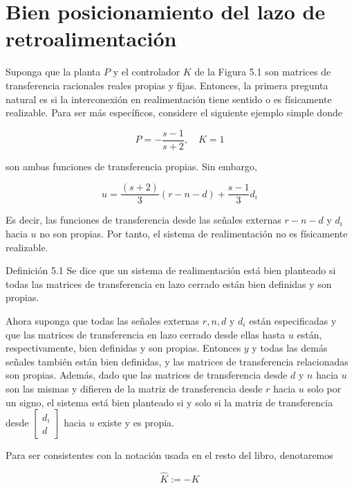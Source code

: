 
\section{Bien posicionamiento del lazo de retroalimentación}
Suponga que la planta $P$ y el controlador $K$ de la Figura 5.1 son matrices de transferencia racionales reales propias y fijas. Entonces, la primera pregunta natural es si la interconexión en realimentación tiene sentido o es físicamente realizable. Para ser más específicos, considere el siguiente ejemplo simple donde

$$
P=-\frac{s-1}{s+2}, \quad K=1
$$

son ambas funciones de transferencia propias. Sin embargo,

$$
u=\frac{(s+2)}{3}(r-n-d)+\frac{s-1}{3} d_{i}
$$

Es decir, las funciones de transferencia desde las señales externas $r-n-d$ y $d_{i}$ hacia $u$ no son propias. Por tanto, el sistema de realimentación no es físicamente realizable.

Definición 5.1 Se dice que un sistema de realimentación está bien planteado si todas las matrices de transferencia en lazo cerrado están bien definidas y son propias.

Ahora suponga que todas las señales externas $r, n, d$ y $d_{i}$ están especificadas y que las matrices de transferencia en lazo cerrado desde ellas hasta $u$ están, respectivamente, bien definidas y son propias. Entonces $y$ y todas las demás señales también están bien definidas, y las matrices de transferencia relacionadas son propias. Además, dado que las matrices de transferencia desde $d$ y $n$ hacia $u$ son las mismas y difieren de la matriz de transferencia desde $r$ hacia $u$ solo por un signo, el sistema está bien planteado si y solo si la matriz de transferencia desde $\left[\begin{array}{c}d_{i} \\ d\end{array}\right]$ hacia $u$ existe y es propia.

Para ser consistentes con la notación usada en el resto del libro, denotaremos


\begin{equation*}
\hat{K}:=-K \tag{5.1}
\end{equation*}


